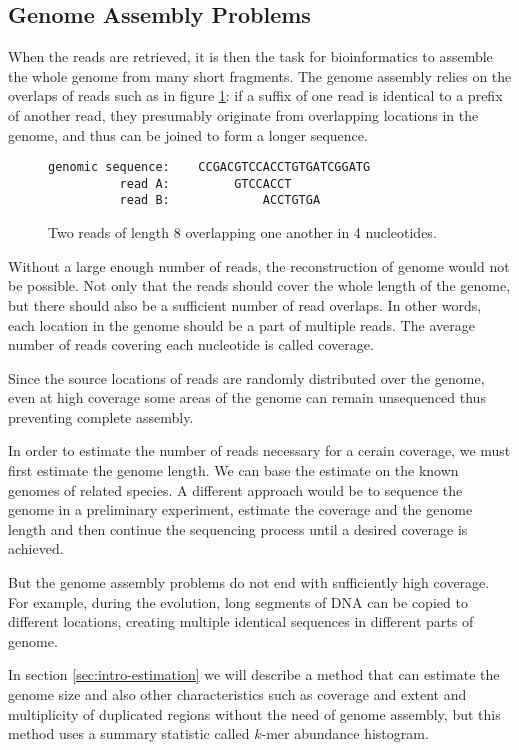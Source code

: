 \subsection{Genome Assembly Problems}
\label{sec:assembly}
When the reads are retrieved, it is then the task for bioinformatics to assemble the
whole genome from many short fragments. The genome assembly relies on the overlaps
of reads such as in figure \ref{fig:overlapping-reads}: if a suffix of one read is
identical to a prefix of another read, they presumably originate from overlapping
locations in the genome, and thus can be joined to form a longer sequence.

\begin{figure}[h]
\centering
\begin{varwidth}{\linewidth}
\begin{verbatim}
genomic sequence:    CCGACGTCCACCTGTGATCGGATG
          read A:         GTCCACCT
          read B:             ACCTGTGA
\end{verbatim}
\end{varwidth}
\caption[Two overlapping reads]{Two reads of length 8 overlapping one another in 4 nucleotides.}
\label{fig:overlapping-reads}
\end{figure}

Without a large enough number of reads, the reconstruction of genome would not be possible.
Not only that the reads should cover the whole length of the genome, but there should also
be a sufficient number of read overlaps. In other words, each location in the genome should
be a part of multiple reads. The average number of reads covering each nucleotide
is called coverage. 

Since the source locations of reads are randomly distributed over the genome, even at high coverage
some areas of the genome can remain unsequenced thus preventing complete assembly.

In order to estimate the number of reads necessary for a cerain coverage, we must first
estimate the genome length. We can base the estimate on the known genomes of related species.
A different approach would be to sequence the genome in a preliminary experiment, 
estimate the coverage and the genome length and then continue the sequencing process
until a desired coverage is achieved.

\medskip

But the genome assembly problems do not end with sufficiently high coverage.
For example, during the evolution, long segments of DNA can be copied to different locations, 
creating multiple identical sequences in different parts of genome. 

In section \ref{sec:intro-estimation} we will describe a method that can estimate
the genome size and also other characteristics such as coverage and extent and multiplicity
of duplicated regions without the need of genome assembly, but this method uses a summary 
statistic called $k$-mer abundance histogram.

